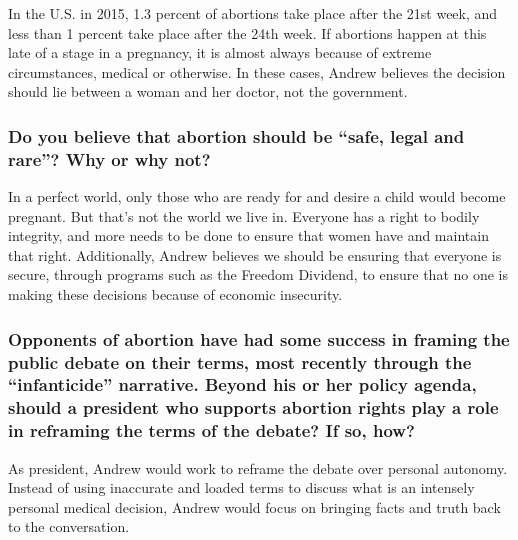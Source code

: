 In the U.S. in 2015, 1.3 percent of abortions take place after the 21st
week, and less than 1 percent take place after the 24th week. If
abortions happen at this late of a stage in a pregnancy, it is almost
always because of extreme circumstances, medical or otherwise. In these
cases, Andrew believes the decision should lie between a woman and her
doctor, not the government.

\hypertarget{do-you-believe-that-abortion-should-be-safe-legal-and-rare-why-or-why-not-9}{%
\subsubsection{Do you believe that abortion should be ``safe, legal and
rare''? Why or why
not?}\label{do-you-believe-that-abortion-should-be-safe-legal-and-rare-why-or-why-not-9}}

In a perfect world, only those who are ready for and desire a child
would become pregnant. But that's not the world we live in. Everyone has
a right to bodily integrity, and more needs to be done to ensure that
women have and maintain that right. Additionally, Andrew believes we
should be ensuring that everyone is secure, through programs such as the
Freedom Dividend, to ensure that no one is making these decisions
because of economic insecurity.

\hypertarget{opponents-of-abortion-have-had-some-success-in-framing-the-public-debate-on-their-terms-most-recently-through-the-infanticide-narrative-beyond-his-or-her-policy-agenda-should-a-president-who-supports-abortion-rights-play-a-role-in-reframing-the-terms-of-the-debate-if-so-how-9}{%
\subsubsection{Opponents of abortion have had some success in framing
the public debate on their terms, most recently through the
``infanticide'' narrative. Beyond his or her policy agenda, should a
president who supports abortion rights play a role in reframing the
terms of the debate? If so,
how?}\label{opponents-of-abortion-have-had-some-success-in-framing-the-public-debate-on-their-terms-most-recently-through-the-infanticide-narrative-beyond-his-or-her-policy-agenda-should-a-president-who-supports-abortion-rights-play-a-role-in-reframing-the-terms-of-the-debate-if-so-how-9}}

As president, Andrew would work to reframe the debate over personal
autonomy. Instead of using inaccurate and loaded terms to discuss what
is an intensely personal medical decision, Andrew would focus on
bringing facts and truth back to the conversation.

